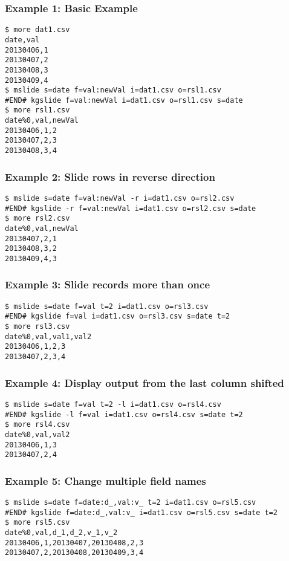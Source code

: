 \subsubsection*{Example 1: Basic Example}



\begin{Verbatim}[baselinestretch=0.7,frame=single]
$ more dat1.csv
date,val
20130406,1
20130407,2
20130408,3
20130409,4
$ mslide s=date f=val:newVal i=dat1.csv o=rsl1.csv
#END# kgslide f=val:newVal i=dat1.csv o=rsl1.csv s=date
$ more rsl1.csv
date%0,val,newVal
20130406,1,2
20130407,2,3
20130408,3,4
\end{Verbatim}
\subsubsection*{Example 2: Slide rows in reverse direction}



\begin{Verbatim}[baselinestretch=0.7,frame=single]
$ mslide s=date f=val:newVal -r i=dat1.csv o=rsl2.csv
#END# kgslide -r f=val:newVal i=dat1.csv o=rsl2.csv s=date
$ more rsl2.csv
date%0,val,newVal
20130407,2,1
20130408,3,2
20130409,4,3
\end{Verbatim}
\subsubsection*{Example 3: Slide records more than once}



\begin{Verbatim}[baselinestretch=0.7,frame=single]
$ mslide s=date f=val t=2 i=dat1.csv o=rsl3.csv
#END# kgslide f=val i=dat1.csv o=rsl3.csv s=date t=2
$ more rsl3.csv
date%0,val,val1,val2
20130406,1,2,3
20130407,2,3,4
\end{Verbatim}
\subsubsection*{Example 4: Display output from the last column shifted}



\begin{Verbatim}[baselinestretch=0.7,frame=single]
$ mslide s=date f=val t=2 -l i=dat1.csv o=rsl4.csv
#END# kgslide -l f=val i=dat1.csv o=rsl4.csv s=date t=2
$ more rsl4.csv
date%0,val,val2
20130406,1,3
20130407,2,4
\end{Verbatim}
\subsubsection*{Example 5: Change multiple field names}



\begin{Verbatim}[baselinestretch=0.7,frame=single]
$ mslide s=date f=date:d_,val:v_ t=2 i=dat1.csv o=rsl5.csv
#END# kgslide f=date:d_,val:v_ i=dat1.csv o=rsl5.csv s=date t=2
$ more rsl5.csv
date%0,val,d_1,d_2,v_1,v_2
20130406,1,20130407,20130408,2,3
20130407,2,20130408,20130409,3,4
\end{Verbatim}
